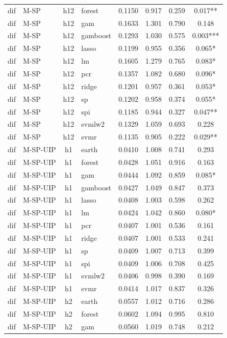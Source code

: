 \begin{ThreePartTable}
\begin{longtable}[t]{llclcccc}
dif & M-SP & h12 & forest & 0.1150 & 0.917 & 0.259 & 0.017**\\
dif & M-SP & h12 & gam & 0.1633 & 1.301 & 0.790 & 0.148\\
dif & M-SP & h12 & gamboost & 0.1293 & 1.030 & 0.575 & 0.003***\\
dif & M-SP & h12 & lasso & 0.1199 & 0.955 & 0.356 & 0.065*\\
dif & M-SP & h12 & lm & 0.1605 & 1.279 & 0.765 & 0.083*\\
dif & M-SP & h12 & pcr & 0.1357 & 1.082 & 0.680 & 0.096*\\
dif & M-SP & h12 & ridge & 0.1201 & 0.957 & 0.361 & 0.053*\\
dif & M-SP & h12 & sp & 0.1202 & 0.958 & 0.374 & 0.055*\\
dif & M-SP & h12 & spi & 0.1185 & 0.944 & 0.327 & 0.047**\\
dif & M-SP & h12 & svmlw2 & 0.1329 & 1.059 & 0.693 & 0.228\\
dif & M-SP & h12 & svmr & 0.1135 & 0.905 & 0.222 & 0.029**\\
\addlinespace
dif & M-SP-UIP & h1 & earth & 0.0410 & 1.008 & 0.741 & 0.293\\
dif & M-SP-UIP & h1 & forest & 0.0428 & 1.051 & 0.916 & 0.163\\
dif & M-SP-UIP & h1 & gam & 0.0444 & 1.092 & 0.859 & 0.085*\\
dif & M-SP-UIP & h1 & gamboost & 0.0427 & 1.049 & 0.847 & 0.373\\
dif & M-SP-UIP & h1 & lasso & 0.0408 & 1.003 & 0.598 & 0.262\\
dif & M-SP-UIP & h1 & lm & 0.0424 & 1.042 & 0.860 & 0.080*\\
dif & M-SP-UIP & h1 & pcr & 0.0407 & 1.001 & 0.536 & 0.161\\
dif & M-SP-UIP & h1 & ridge & 0.0407 & 1.001 & 0.533 & 0.241\\
dif & M-SP-UIP & h1 & sp & 0.0409 & 1.007 & 0.713 & 0.399\\
dif & M-SP-UIP & h1 & spi & 0.0409 & 1.006 & 0.708 & 0.425\\
dif & M-SP-UIP & h1 & svmlw2 & 0.0406 & 0.998 & 0.390 & 0.169\\
dif & M-SP-UIP & h1 & svmr & 0.0414 & 1.017 & 0.837 & 0.326\\
\addlinespace
dif & M-SP-UIP & h2 & earth & 0.0557 & 1.012 & 0.716 & 0.286\\
dif & M-SP-UIP & h2 & forest & 0.0602 & 1.094 & 0.995 & 0.810\\
dif & M-SP-UIP & h2 & gam & 0.0560 & 1.019 & 0.748 & 0.212\\

\end{longtable}
\end{ThreePartTable}

